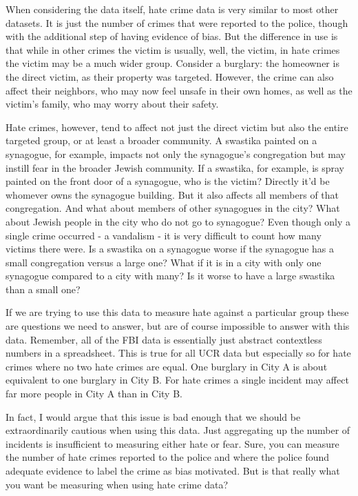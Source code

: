 \documentclass[
]{krantz}
\begin{document}
When considering the data itself, hate crime data is very
similar to most other datasets. It is just the number of
crimes that were reported to the police, though with the
additional step of having evidence of bias. But the
difference in use is that while in other crimes the victim
is usually, well, the victim, in hate crimes the victim may
be a much wider group. Consider a burglary: the homeowner is
the direct victim, as their property was targeted. However,
the crime can also affect their neighbors, who may now feel
unsafe in their own homes, as well as the victim's family,
who may worry about their safety.

Hate crimes, however, tend to affect not just the direct
victim but also the entire targeted group, or at least a
broader community. A swastika painted on a synagogue, for
example, impacts not only the synagogue's congregation but
may instill fear in the broader Jewish community. If a
swastika, for example, is spray painted on the front door of
a synagogue, who is the victim? Directly it'd be whomever
owns the synagogue building. But it also affects all members
of that congregation. And what about members of other
synagogues in the city? What about Jewish people in the city
who do not go to synagogue? Even though only a single crime
occurred - a vandalism - it is very difficult to count how
many victims there were. Is a swastika on a synagogue worse
if the synagogue has a small congregation versus a large
one? What if it is in a city with only one synagogue
compared to a city with many? Is it worse to have a large
swastika than a small one?

If we are trying to use this data to measure hate against a
particular group these are questions we need to answer, but
are of course impossible to answer with this data. Remember,
all of the FBI data is essentially just abstract contextless
numbers in a spreadsheet. This is true for all UCR data but
especially so for hate crimes where no two hate crimes are
equal. One burglary in City A is about equivalent to one
burglary in City B. For hate crimes a single incident may
affect far more people in City A than in City B.

In fact, I would argue that this issue is bad enough that we
should be extraordinarily cautious when using this data.
Just aggregating up the number of incidents is insufficient
to measuring either hate or fear. Sure, you can measure the
number of hate crimes reported to the police and where the
police found adequate evidence to label the crime as bias
motivated. But is that really what you want be measuring
when using hate crime data?
\end{document}
